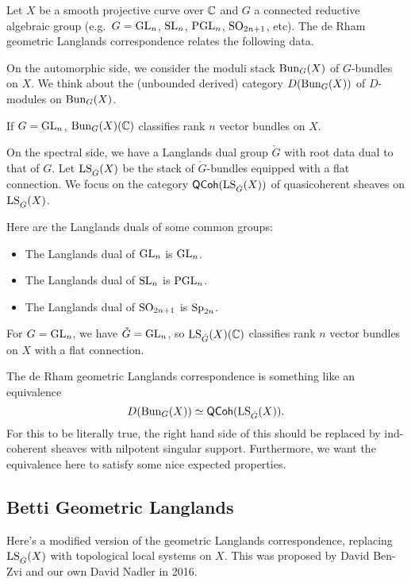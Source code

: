 \documentclass{article}
\begin{document}
Let $X$ be a smooth projective curve over $\mathbb{C}$ and $G$ a connected reductive algebraic group (e.g.\ $G = \operatorname{GL}_n$, $\operatorname{SL}_n$, $\operatorname{PGL}_n$, $\operatorname{SO}_{2n+1}$, etc).
The de Rham geometric Langlands correspondence relates the following data.

On the automorphic side, we consider the moduli stack $\operatorname{Bun}_G(X)$ of $G$-bundles on $X$.
We think about the (unbounded derived) category $D(\operatorname{Bun}_G(X))$ of $D$-modules on $\operatorname{Bun}_G(X)$.

\begin{ex}
  If $G = \operatorname{GL}_n$, $\operatorname{Bun}_G(X)(\mathbb{C})$ classifies rank $n$ vector bundles on $X$.
\end{ex}

On the spectral side, we have a Langlands dual group $\check{G}$ with root data dual to that of $G$.
Let $\operatorname{LS}_{\check{G}}(X)$ be the stack of $\check{G}$-bundles equipped with a flat connection.
We focus on the category $\mathsf{QCoh}(\operatorname{LS}_{\check{G}}(X))$ of quasicoherent sheaves on $\operatorname{LS}_{\check{G}}(X)$.

\begin{ex}
  Here are the Langlands duals of some common groups:
  \begin{itemize}
    \item The Langlands dual of $\operatorname{GL}_n$ is $\operatorname{GL}_n$.
    \item The Langlands dual of $\operatorname{SL}_n$ is $\operatorname{PGL}_n$.
    \item The Langlands dual of $\operatorname{SO}_{2n+1}$ is $\operatorname{Sp}_{2n}$.
  \end{itemize}
\end{ex}

\begin{ex}
  For $G = \operatorname{GL}_n$, we have $\check{G} = \operatorname{GL}_n$, so $\operatorname{LS}_{\check{G}}(X)(\mathbb{C})$ classifies rank $n$ vector bundles on $X$ with a flat connection.
\end{ex}

The de Rham geometric Langlands correspondence is something like an equivalence
\[
  D(\operatorname{Bun}_G(X)) \simeq \mathsf{QCoh}(\operatorname{LS}_{\check{G}}(X)).
\]
For this to be literally true, the right hand side of this should be replaced by ind-coherent sheaves with nilpotent singular support.
Furthermore, we want the equivalence here to satisfy some nice expected properties.

\subsection{Betti Geometric Langlands}

Here's a modified version of the geometric Langlands correspondence, replacing $\operatorname{LS}_{\check{G}}(X)$ with topological local systems on $X$.
This was proposed by David Ben-Zvi and our own David Nadler in 2016.
\end{document}
